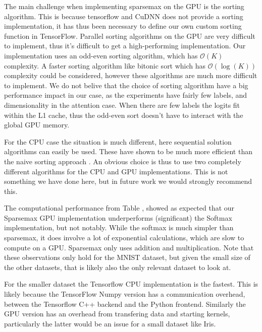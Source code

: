 The main challenge when implementing sparsemax on the GPU is the sorting algorithm. This is because tensorflow and CuDNN does not provide a sorting implementation, it has thus been necessary to define our own custom sorting function in TensorFlow. Parallel sorting algorithms on the GPU are very difficult to implement, thus it's difficult to get a high-performing implementation. Our implementation uses an odd-even sorting algorithm, which has $\mathcal{O}(K)$ complexity. A faster sorting algorithm like bitonic sort which has $\mathcal{O}(\log(K))$ complexity could be considered, however these algorithms are much more difficult to implement. We do not belive that the choice of sorting algorithm have a big performance impact in our case, as the experiments have fairly few labels, and dimensionality in the attention case. When there are few labels the logits fit within the L1 cache, thus the odd-even sort doesn't have to interact with the global GPU memory. 

For the CPU case the situation is much different, here sequential solution algorithms can easily be used. These have shown to be much more efficient than the naive sorting approach \cite{Liu2016}. An obvious choice is thus to use two completely different algorithms for the CPU and GPU implementations. This is not something we have done here, but in future work we would strongly recommend this.

The computational performance from Table \label{tab:timings}, showed as expected that our Sparsemax GPU implementation underperforms (significant) the Softmax implementation, but not notably. While the softmax is much simpler than sparsemax, it does involve a lot of exponential calculations, which are slow to compute on a GPU. Sparsemax only uses addition and multiplication. Note that these observations only hold for the MNIST dataset, but given the small size of the other datasets, that is likely also the only relevant dataset to look at.

For the smaller dataset the Tensorflow CPU implementation is the fastest. This is likely because the TensorFlow Numpy version has a communication overhead, between the Tensorflow C++ backend and the Python frontend. Similarly the GPU version has an overhead from transfering data and starting kernels, particularly the latter would be an issue for a small dataset like Iris.

